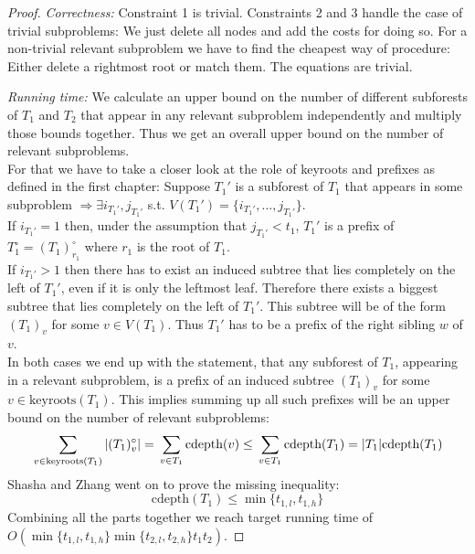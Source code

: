 \begin{proof}
\textit{Correctness: } Constraint 1 is trivial. Constraints 2 and 3 handle the case of trivial subproblems: We just delete all nodes and add the costs for doing so. For a non-trivial relevant subproblem we have to find the cheapest way of procedure: Either delete a rightmost root or match them. The equations are trivial. 

\textit{Running time: }We calculate an upper bound on the number of different subforests of $T_1$ and $T_2$ that appear in any relevant subproblem independently and multiply those bounds together. Thus we get an overall upper bound on the number of relevant subproblems.\\
For that we have to take a closer look at the role of keyroots and prefixes as defined in the first chapter: Suppose $T_1'$ is a subforest of $T_1$ that appears in some subproblem $\Rightarrow \exists i_{T_1'}, j_{T_1'}$ s.t. $V(T_1')=\{i_{T_1'},...,j_{T_1'}\}$. \\
If $i_{T_1'} = 1$ then, under the assumption that $j_{T_1'} < t_1$, $T_1'$ is a prefix of $T_1^{\circ} = (T_1)_{r_1}^{\circ}$ where $r_1$ is the root of $T_1$.\\
If $i_{T_1'} > 1$ then there has to exist an induced subtree that lies completely on the left of $T_1'$, even if it is only the leftmost leaf. Therefore there exists a biggest subtree that lies completely on the left of $T_1'$. This subtree will be of the form $(T_1)_v$ for some $v \in V(T_1)$. Thus $T_1'$ has to be a prefix of the right sibling $w$ of $v$.\\
In both cases we end up with the statement, that any subforest of $T_1$, appearing in a relevant subproblem, is a prefix of an induced subtree $(T_1)_v$ for some $v \in \text{keyroots}(T_1)$. This implies summing up all such prefixes will be an upper bound on the number of relevant subproblems:
$$\sideset{}{}\sum_{v \in \text{keyroots}(T_1)} |(T_1)_v^{\circ}| = \sideset{}{}\sum_{v \in T_1} \text{cdepth}(v) \leq \sideset{}{}\sum_{v \in T_1}\text{cdepth}(T_1)= |T_1|\text{cdepth}(T_1)$$
Shasha and Zhang went on to prove the missing inequality:
$$\text{cdepth}(T_1) \leq \min \{t_{1,l}, t_{1,h}\}$$
Combining all the parts together we reach target running time of $O(\min \{t_{1,l},t_{1,h}\} \min \{t_{2,l}, t_{2,h}\}t_1t_2)$.
\end{proof}

